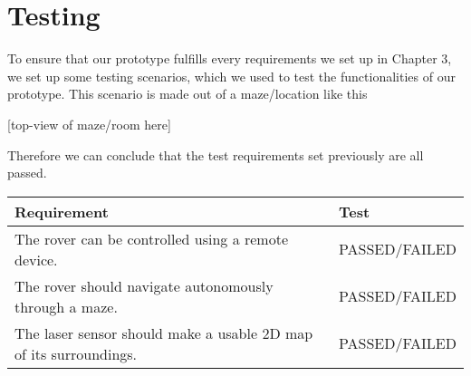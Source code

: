 \section{Testing}

To ensure that our prototype fulfills every requirements we set up in Chapter 3, we set up some testing scenarios, which we used to test the functionalities of our prototype. This scenario is made out of a maze/location like this

[top-view of maze/room here]



Therefore we can conclude that the test requirements set previously are all passed.

\begin{table}[H]
	\begin{tabular}{|l|l|}
		\hline
		\textbf{Requirement} & \textbf{Test} \\ \hline
		The rover can be controlled using a remote device. & PASSED/FAILED \\ \hline
		The rover should navigate autonomously through a maze. & PASSED/FAILED \\ \hline
		The laser sensor should make a usable 2D map of its surroundings. & PASSED/FAILED \\ \hline
	\end{tabular}
\end{table}



